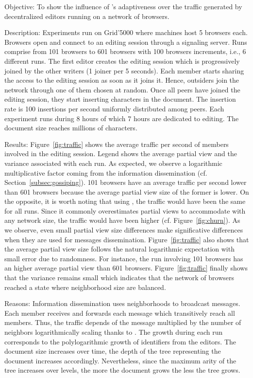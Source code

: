 \begin{asparadesc}
\item [Objective:] To show the influence of \SPRAY's adaptiveness over the
  traffic generated by decentralized editors running on a network of browsers.
\item [Description:] Experiments run on Grid'5000 where machines host 5 browsers
  each. Browsers open \CRATE and connect to an editing session through a
  signaling server.  Runs comprise from 101 browsers to 601 browsers with 100
  browsers increments, i.e., 6 different runs.  The first editor creates the
  editing session which is progressively joined by the other writers (1 joiner
  per 5 seconds). Each member starts sharing the access to the editing session
  as soon as it joins it. Hence, outsiders join the network through one of them
  chosen at random. Once all peers have joined the editing session, they start
  inserting characters in the document. The insertion rate is 100 insertions per
  second uniformly distributed among peers. Each experiment runs during 8 hours
  of which 7 hours are dedicated to editing. The document size reaches millions
  of characters.
\item [Results:] Figure~\ref{fig:traffic} shows the average traffic per second
  of members involved in the editing session. Legend shows the average partial
  view and the variance associated with each run. As expected, we observe a
  logarithmic multiplicative factor coming from the information dissemination
  (cf. Section~\ref{subsec:gossiping}). 101 browsers have an average traffic per
  second lower than 601 browsers because the average partial view size of the
  former is lower.  On the opposite, it is worth noting that using \CYCLON, the
  traffic would have been the same for all runs. Since it commonly overestimates
  partial views to accommodate with any network size, the traffic would have
  been higher (cf. Figure~\ref{fig:churn}). As we observe, even small partial
  view size differences make significative differences when they are used for
  messages dissemination.  Figure~\ref{fig:traffic} also shows that the average
  partial view size follows the natural logarithmic expectation with small error
  due to randomness. For instance, the run involving 101 browsers has an higher
  average partial view than 601 browsers. Figure~\ref{fig:traffic} finally shows
  that the variance remains small which indicates that the network of browsers
  reached a state where neighborhood size are balanced.
\item [Reasons:] Information dissemination uses neighborhoods to broadcast
  messages. Each member receives and forwards each message which transitively
  reach all members. Thus, the traffic depends of the message multiplied by the
  number of neighbors logarithmically scaling thanks to \SPRAY. The growth
  during each run corresponds to the polylogarithmic growth of identifiers from
  the editors. The document size increases over time, the depth of the \LSEQ
  tree representing the document increases accordingly. Nevertheless, since the
  maximum arity of the tree increases over levels, the more the document grows
  the less the tree grows.
\end{asparadesc}
